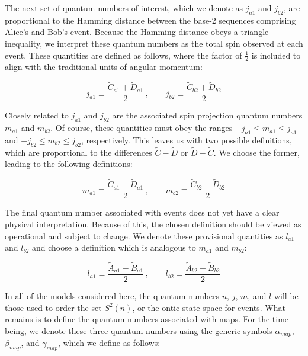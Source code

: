 \documentclass{article}
\begin{document}
The next set of quantum numbers of interest, which we denote as $j_{a1}$ and $j_{b2}$, are proportional to the Hamming distance between the base-2 sequences comprising Alice's and Bob's event. Because the Hamming distance obeys a triangle inequality, we interpret these quantum numbers as the total spin observed at each event. These quantities are defined as follows, where the factor of $\frac{1}{2}$ is included to align with the traditional units of angular momentum:

\begin{equation}
j_{a1}\equiv\frac{\tilde{C}_{a1}+\tilde{D}_{a1}}{2}\,,\qquad j_{b2}\equiv\frac{\tilde{C}_{b2}+\tilde{D}_{b2}}{2}\label{eq: j}
\end{equation}

Closely related to $j_{a1}$ and $j_{b2}$ are the associated spin projection quantum numbers $m_{a1}$ and $m_{b2}$. Of course, these quantities must obey the ranges $-j_{a1}\leq m_{a1}\leq j_{a1}$ and $-j_{b2}\leq m_{b2}\leq j_{b2}$, respectively. This leaves us with two possible definitions, which are proportional to the differences $\tilde{C}-\tilde{D}$ or $\tilde{D}-\tilde{C}$. We choose the former, leading to the following definitions:

\begin{equation}
m_{a1}\equiv\frac{\tilde{C}_{a1}-\tilde{D}_{a1}}{2}\,,\qquad m_{b2}\equiv\frac{\tilde{C}_{b2}-\tilde{D}_{b2}}{2}\label{eq: m}
\end{equation}

The final quantum number associated with events does not yet have a clear physical interpretation. Because of this, the chosen definition should be viewed as operational and subject to change. We denote these provisional quantities as $l_{a1}$ and $l_{b2}$ and choose a definition which is analogous to $m_{a1}$ and $m_{b2}$:

\begin{equation}
l_{a1}\equiv\frac{\tilde{A}_{a1}-\tilde{B}_{a1}}{2}\,,\qquad l_{b2}\equiv\frac{\tilde{A}_{b2}-\tilde{B}_{b2}}{2}\label{eq: l}
\end{equation}

In all of the models considered here, the quantum numbers $n$, $j$, $m$, and $l$ will be those used to order the set $S^2(n)$, or the ontic state space for events. What remains is to define the quantum numbers associated with maps. For the time being, we denote these three quantum numbers using the generic symbols $\alpha_{map}$, $\beta_{map}$, and $\gamma_{map}$, which we define as follows:
\end{document}
